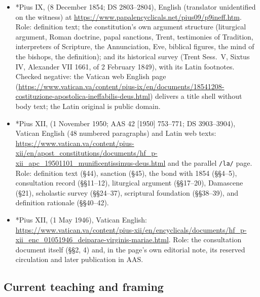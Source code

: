 \begin{itemize}
bearing), 852 (Lyons II, 1274), 1337 (Florence, 1442), 1400 and
1425--1426 (Sixtus IV,  and ),
1516 (Trent, Session V, can.~6), 1880 (Paul IV, , 1555), 2015--2017 (Alexander VII, , 8 December 1661), 2803--2804 (the 1854 definition and
sanction). Role: Latin textual control. The witness's date for
 (27 February 1477, ``1476 st.~cur.'') and its
running heading ``Pie IV'' at DS 1880 are recorded as found.
\item *Pius IX,  (8 December 1854; DS
2803--2804), English (translator unidentified on the witness) at
\url{https://www.papalencyclicals.net/pius09/p9ineff.htm}. Role:
definition text; the constitution's own argument structure (liturgical
argument, Roman doctrine, papal sanctions, Trent, testimonies of
Tradition, interpreters of Scripture, the Annunciation, Eve, biblical
figures, the mind of the bishops, the definition); and its historical
survey (Trent Sess.~V, Sixtus IV, Alexander VII 1661, 
of 2 February 1849), with its Latin footnotes. Checked negative: the
Vatican web English page
(\url{https://www.vatican.va/content/pius-ix/en/documents/18541208-costituzione-apostolica-ineffabilis-deus.html})
delivers a title shell without body text; the Latin original is public
domain.
\item *Pius XII,  (1 November 1950; AAS 42
[1950] 753--771; DS 3903--3904), Vatican English (48 numbered
paragraphs) and Latin web texts:
\url{https://www.vatican.va/content/pius-xii/en/apost_constitutions/documents/hf_p-xii_apc_19501101_munificentissimus-deus.html}
and the parallel \texttt{/la/} page. Role: definition text (\S44),
sanction (\S45), the bond with 1854 (\S\S4--5), consultation record
(\S\S11--12), liturgical argument (\S\S17--20), Damascene (\S21),
scholastic survey (\S\S24--37), scriptural foundation (\S\S38--39), and
definition rationale (\S\S40--42).
\item *Pius XII,  (1 May 1946), Vatican
English:
\url{https://www.vatican.va/content/pius-xii/en/encyclicals/documents/hf_p-xii_enc_01051946_deiparae-virginis-mariae.html}.
Role: the consultation document itself (\S\S2, 4) and, in the page's own
editorial note, its reserved circulation and later publication in AAS.
\end{itemize}

\subsection*{Current teaching and framing}

